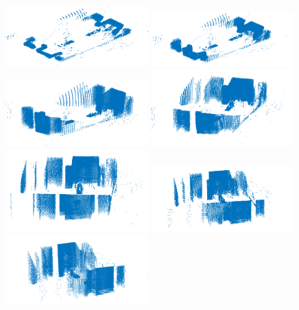 \begin{figure}
  \centering \footnotesize
  \includegraphics[width=0.49\textwidth]{images/pasadizo_8.png}
  \includegraphics[width=0.49\textwidth]{images/pasadizo_7.png}
  \includegraphics[width=0.49\textwidth]{images/pasadizo_6.png}
  \includegraphics[width=0.49\textwidth]{images/pasadizo_5.png}
  \includegraphics[width=0.49\textwidth]{images/pasadizo_4.png}
  \includegraphics[width=0.49\textwidth]{images/pasadizo_3.png}
  \includegraphics[width=0.49\textwidth]{images/pasadizo_2.png}

\end{figure}
